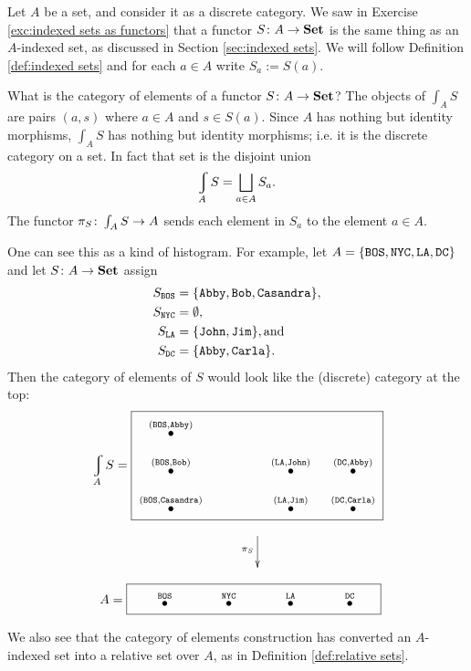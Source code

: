 \documentclass[CT4S-EN-RU]{subfiles}
\begin{document}
\begin{exampleENG}
Let $A$ be a set, and consider it as a discrete category. We saw in Exercise \ref{exc:indexed sets as functors} that a functor $S\colon A\rightarrow{\bf Set}$ is the same thing as an $A$-indexed set, as discussed in Section \ref{sec:indexed sets}. We will follow Definition \ref{def:indexed sets} and for each $a\in A$ write $S_a:=S(a)$.

What is the category of elements of a functor $S\colon A\rightarrow{\bf Set}$? The objects of $\int_AS$ are pairs $(a,s)$ where $a\in A$ and $s\in S(a)$. Since $A$ has nothing but identity morphisms, $\int_AS$ has nothing but identity morphisms; i.e. it is the discrete category on a set. In fact that set is the disjoint union $$\varint_AS=\bigsqcup_{a\in A}S_a.$$ The functor $\pi_S\colon\int_AS\rightarrow A$ sends each element in $S_a$ to the element $a\in A$. 

One can see this as a kind of histogram. For example, let $A=\{{\tt BOS, NYC, LA, DC}\}$ and let $S\colon A\rightarrow{\bf Set}$ assign 
\begin{align*}
S_{{\tt BOS}}&=\{{\tt Abby, Bob, Casandra}\},\\
S_{\tt NYC}&=\emptyset,\\
S_{\tt LA}&=\{{\tt John, Jim}\}, \textnormal{and}\\
S_{\tt DC}&=\{{\tt Abby,Carla}\}.
\end{align*}
Then the category of elements of $S$ would look like the (discrete) category at the top: 
\begin{align}\label{dia:elements for cities}
\varint_AS=\parbox{2.7in}{\fbox{\xymatrix@=10pt{
\LTO{(BOS,Abby)}\\
\LTO{(BOS,Bob)}&\hspace{.3in}&\LTO{(LA,John)}&\LTO{(DC,Abby)}\\
\LTO{(BOS,Casandra)}&&\LTO{(LA,Jim)}&\LTO{(DC,Carla)}
}}}
\end{align}
$$
\hsp\xymatrix{~\ar[d]_{\pi_S}\\~}
$$
$$
\;\;A=\fbox{\xymatrix@=33pt{\hspace{.25in}\LTO{BOS}&\LTO{NYC}&\LTO{LA}&\LTO{DC}\hspace{.2in}}}
$$

We also see that the category of elements construction has converted an $A$-indexed set into a relative set over $A$, as in Definition \ref{def:relative sets}.
\end{exampleENG}

\begin{exampleRUS}
\end{exampleRUS}
\end{document}
